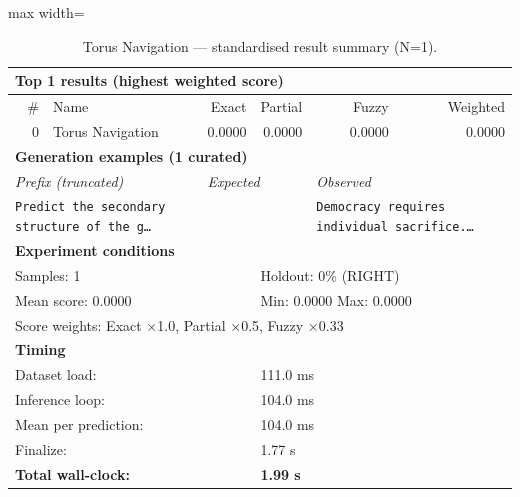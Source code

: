 \begin{table}[htbp]
\centering
\caption{Torus Navigation — standardised result summary (N=1).}
\label{tab:torus_navigation_summary}
\begin{adjustbox}{max width=\textwidth}
\begin{tabular}{r p{5cm} r r r r}
\toprule
\multicolumn{6}{l}{\textbf{Top 1 results (highest weighted score)}} \\
\midrule
\# & Name & Exact & Partial & Fuzzy & Weighted \\
\midrule
0 & Torus Navigation & 0.0000 & 0.0000 & 0.0000 & 0.0000 \\
\midrule
\multicolumn{6}{l}{\textbf{Generation examples (1 curated)}} \\
\midrule
\multicolumn{2}{l}{\textit{Prefix (truncated)}} & \multicolumn{2}{l}{\textit{Expected}} & \multicolumn{2}{l}{\textit{Observed}} \\
\midrule
\multicolumn{2}{l}{\texttt{Predict the secondary structure of the g\ldots}} & \multicolumn{2}{l}{\texttt{}} & \multicolumn{2}{l}{\texttt{Democracy requires individual sacrifice.\ldots}} \\
\midrule
\multicolumn{6}{l}{\textbf{Experiment conditions}} \\
\midrule
\multicolumn{3}{l}{Samples: 1} & \multicolumn{3}{l}{Holdout: 0\% (RIGHT)} \\
\multicolumn{3}{l}{Mean score: 0.0000} & \multicolumn{3}{l}{Min: 0.0000 \quad Max: 0.0000} \\
\multicolumn{6}{l}{Score weights: Exact $\times$1.0, Partial $\times$0.5, Fuzzy $\times$0.33} \\
\midrule
\multicolumn{6}{l}{\textbf{Timing}} \\
\midrule
\multicolumn{3}{l}{Dataset load:} & \multicolumn{3}{l}{111.0 ms} \\
\multicolumn{3}{l}{Inference loop:} & \multicolumn{3}{l}{104.0 ms} \\
\multicolumn{3}{l}{Mean per prediction:} & \multicolumn{3}{l}{104.0 ms} \\
\multicolumn{3}{l}{Finalize:} & \multicolumn{3}{l}{1.77 s} \\
\multicolumn{3}{l}{\textbf{Total wall-clock:}} & \multicolumn{3}{l}{\textbf{1.99 s}} \\
\bottomrule
\end{tabular}
\end{adjustbox}
\end{table}
